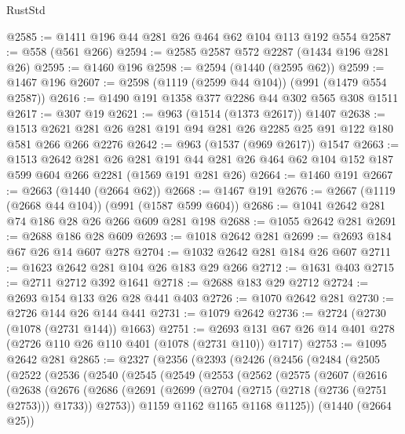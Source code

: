 \begin{lexlean}{RustStd}
\begin{coremodule}
{\begin{coremodule}
{{{{{{{@2585 := @1411 @196 @44 @281 @26 @464 @62 @104 @113 @192 @554
@2587 := @558 (@561 @266)
@2594 := @2585 @2587 @572 @2287 (@1434 @196 @281 @26)
@2595 := @1460 @196
@2598 := @2594 (@1440 (@2595 @62))
@2599 := @1467 @196
@2607 := @2598 (@1119 (@2599 @44 @104)) (@991 (@1479 @554 @2587))
@2616 := @1490 @191 @1358 @377 @2286 @44 @302 @565 @308 @1511
@2617 := @307 @19
@2621 := @963 (@1514 (@1373 @2617)) @1407
@2638 := @1513 @2621 @281 @26 @281 @191 @94 @281 @26 @2285 @25 @91 @122 @180 @581 @266 @266 @2276
@2642 := @963 (@1537 (@969 @2617)) @1547
@2663 := @1513
    @2642
    @281
    @26
    @281
    @191
    @44
    @281
    @26
    @464
    @62
    @104
    @152
    @187
    @599
    @604
    @266
    @2281
    (@1569 @191 @281 @26)
@2664 := @1460 @191
@2667 := @2663 (@1440 (@2664 @62))
@2668 := @1467 @191
@2676 := @2667 (@1119 (@2668 @44 @104)) (@991 (@1587 @599 @604))
@2686 := @1041 @2642 @281 @74 @186 @28 @26 @266 @609 @281 @198
@2688 := @1055 @2642 @281
@2691 := @2688 @186 @28 @609
@2693 := @1018 @2642 @281
@2699 := @2693 @184 @67 @26 @14 @607 @278
@2704 := @1032 @2642 @281 @184 @26 @607
@2711 := @1623 @2642 @281 @104 @26 @183 @29 @266
@2712 := @1631 @403
@2715 := @2711 @2712 @392 @1641
@2718 := @2688 @183 @29 @2712
@2724 := @2693 @154 @133 @26 @28 @441 @403
@2726 := @1070 @2642 @281
@2730 := @2726 @144 @26 @144 @441
@2731 := @1079 @2642
@2736 := @2724 (@2730 (@1078 (@2731 @144)) @1663)
@2751 := @2693 @131 @67 @26 @14 @401 @278 (@2726 @110 @26 @110 @401 (@1078 (@2731 @110)) @1717)
@2753 := @1095 @2642 @281
@2865 := @2327
    (@2356
      (@2393
        (@2426
          (@2456
            (@2484
              (@2505
                (@2522
                  (@2536
                    (@2540
                      (@2545
                        (@2549
                          (@2553
                            (@2562
                              (@2575
                                (@2607
                                  (@2616
                                    (@2638
                                      (@2676
                                        (@2686
                                          (@2691
                                            (@2699
                                              (@2704 (@2715 (@2718 (@2736 (@2751 @2753))) @1733))
                                              @2753))
                                          @1159
                                          @1162
                                          @1165
                                          @1168
                                          @1125))
                                      (@1440 (@2664 @25))
}}}}}}}
\end{coremodule}}
\end{coremodule}
\end{lexlean}
